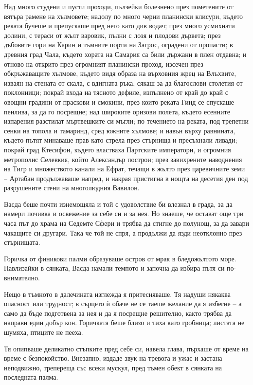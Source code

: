 Над много студени и пусти проходи, пълзейки болезнено през пометените от вятъра
рамене на хълмовете; надолу по много черни планински клисури, където реката
бучеше и препускаше пред него като див водач; през много усмихнати долини, с
тераси от жълт варовик, пълни с лозя и плодови дървета; през дъбовите гори на
Карин и тъмните порти на Загрос, оградени от пропасти; в древния град Чала,
където хората на Самария са били държани в плен отдавна; и отново на открито
през огромният планински проход, изсечен през обкръжаващите хълмове, където видя
образа на върховния жрец на Влъхвите, изваян на стената от скала, с вдигната
ръка, сякаш за да благослови столетия от поклонници; покрай входа на тясното
дефиле, изпълнено от край до край с овощни градини от праскови и смокини, през
които реката Гинд се спускаше пенлива, за да го посрещне; над широките оризови
полета, където есенните изпарения разстилат мъртвешките си мъгли; по течението
на реката, под трепетни сенки на топола и тамаринд, сред южните хълмове; и навън
върху равнината, където пътят минаваше прав като стрела през стърнища и
пресъхнали ливади; покрай град Ктесифон, където властваха Партските императори,
и огромния метрополис Селевкия, който Александър построи; през завихрените
наводнения на Тигр и множеството канали на Ефрат, течащи в жълто през
царевичните земи -- Артабан продължаваше напред, и накрая пристигна в нощта на
десетия ден под разрушените стени на многолюдния Вавилон.

Васда беше почти изнемощяла и той с удоволствие би влезнал в града, за да намери
почивка и освежение за себе си и за нея. Но знаеше, че остават още три часа път
до храма на Седемте Сфери и трябва да стигне до полунощ, за да завари чакащите
си другари. Така че той не спря, а продължи да язди неотклонно през
стърнищата.

Горичка от финикови палми образуваше остров от мрак в бледожълтото море.
Навлизайки в сянката, Васда намали темпото и започна да избира пътя си
по-внимателно.

Нещо в тъмното в далечината изглежда я притесняваше. Тя надуши някаква опасност
или трудност; в сърцето ѝ обаче не се таеше желание да я избегне -- а само да
бъде подготвена за нея и да я посрещне решително, както трябва да направи един
добър кон. Горичката беше близо и тиха като гробница; листата не шумяха, птиците
не пееха.

Тя опипваше деликатно стъпките пред себе си, навела глава, пърхаше от време на
време с безпокойство. Внезапно, издаде звук на тревога и ужас и застана
неподвижно, трепереща със всеки мускул, пред тъмен обект в сянката на последната
палма.

